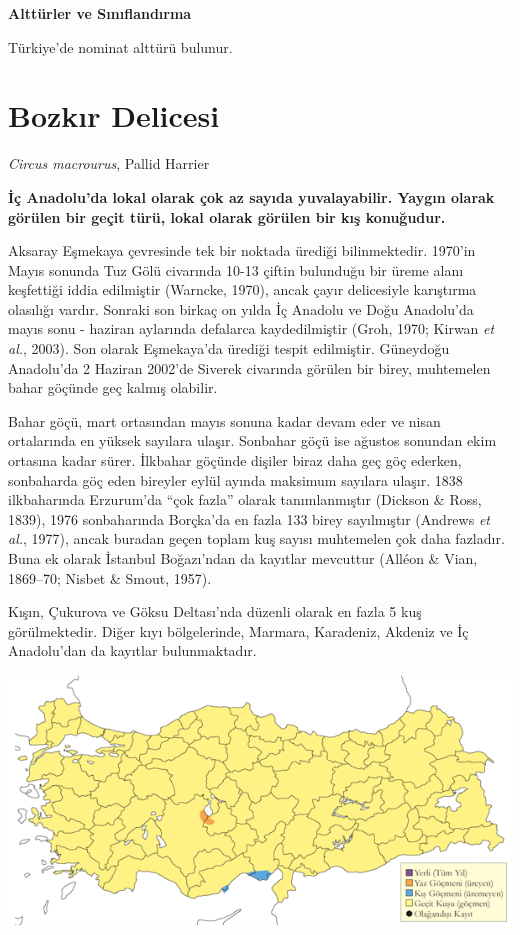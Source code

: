 \documentclass[
  a4paper,
  DIV=11,
  numbers=noendperiod]{scrreprt}
\begin{document}
\textbf{Alttürler ve Sınıflandırma}

Türkiye'de nominat alttürü bulunur.

\section{Bozkır Delicesi}\label{bozkux131r-delicesi}

\emph{Circus macrourus}, Pallid Harrier

\textbf{İç Anadolu'da lokal olarak çok az sayıda yuvalayabilir. Yaygın
olarak görülen bir geçit türü, lokal olarak görülen bir kış konuğudur.}

Aksaray Eşmekaya çevresinde tek bir noktada ürediği bilinmektedir.
1970'in Mayıs sonunda Tuz Gölü civarında 10-13 çiftin bulunduğu bir
üreme alanı keşfettiği iddia edilmiştir (Warncke, 1970), ancak çayır
delicesiyle karıştırma olasılığı vardır. Sonraki son birkaç on yılda İç
Anadolu ve Doğu Anadolu'da mayıs sonu - haziran aylarında defalarca
kaydedilmiştir (Groh, 1970; Kirwan \emph{et al.}, 2003). Son olarak
Eşmekaya'da ürediği tespit edilmiştir. Güneydoğu Anadolu'da 2 Haziran
2002'de Siverek civarında görülen bir birey, muhtemelen bahar göçünde
geç kalmış olabilir.

Bahar göçü, mart ortasından mayıs sonuna kadar devam eder ve nisan
ortalarında en yüksek sayılara ulaşır. Sonbahar göçü ise ağustos
sonundan ekim ortasına kadar sürer. İlkbahar göçünde dişiler biraz daha
geç göç ederken, sonbaharda göç eden bireyler eylül ayında maksimum
sayılara ulaşır. 1838 ilkbaharında Erzurum'da ``çok fazla'' olarak
tanımlanmıştır (Dickson \& Ross, 1839), 1976 sonbaharında Borçka'da en
fazla 133 birey sayılmıştır (Andrews \emph{et al.}, 1977), ancak buradan
geçen toplam kuş sayısı muhtemelen çok daha fazladır. Buna ek olarak
İstanbul Boğazı'ndan da kayıtlar mevcuttur (Alléon \& Vian, 1869--70;
Nisbet \& Smout, 1957).

Kışın, Çukurova ve Göksu Deltası'nda düzenli olarak en fazla 5 kuş
görülmektedir. Diğer kıyı bölgelerinde, Marmara, Karadeniz, Akdeniz ve
İç Anadolu'dan da kayıtlar bulunmaktadır.

\includegraphics{images/harita_Page_104.png}
\end{document}
